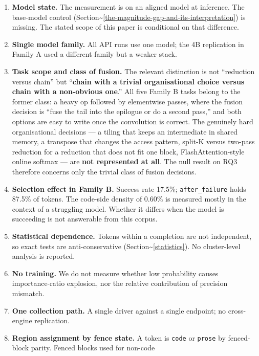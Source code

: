 \documentclass[
  11pt,
]{article}
\providecommand{\tightlist}{%
  \setlength{\itemsep}{0pt}\setlength{\parskip}{0pt}}
\begin{document}
\begin{enumerate}
\def\labelenumi{\arabic{enumi}.}
\tightlist
\item
  \textbf{Model state.} The measurement is on an aligned model at
  inference. The base-model control
  (Section\textasciitilde{}\ref{the-magnitude-gap-and-its-interpretation})
  is missing. The stated scope of this paper is conditional on that
  difference.
\item
  \textbf{Single model family.} All API runs use one model; the 4B
  replication in Family A used a different family but a weaker stack.
\item
  \textbf{Task scope and class of fusion.} The relevant distinction is
  not ``reduction versus chain'' but ``\textbf{chain with a trivial
  organisational choice versus chain with a non-obvious one}.'' All five
  Family B tasks belong to the former class: a heavy op followed by
  elementwise passes, where the fusion decision is ``fuse the tail into
  the epilogue or do a second pass,'' and both options are easy to write
  once the convolution is correct. The genuinely hard organisational
  decisions --- a tiling that keeps an intermediate in shared memory, a
  transpose that changes the access pattern, split-K versus two-pass
  reduction for a reduction that does not fit one block,
  FlashAttention-style online softmax --- are \textbf{not represented at
  all}. The null result on RQ3 therefore concerns only the trivial class
  of fusion decisions.
\item
  \textbf{Selection effect in Family B.} Success rate 17.5\%;
  \texttt{after\_failure} holds 87.5\% of tokens. The code-side density
  of 0.60\% is measured mostly in the context of a struggling model.
  Whether it differs when the model is succeeding is not answerable from
  this corpus.
\item
  \textbf{Statistical dependence.} Tokens within a completion are not
  independent, so exact tests are anti-conservative
  (Section\textasciitilde{}\ref{statistics}). No cluster-level analysis
  is reported.
\item
  \textbf{No training.} We do not measure whether low probability causes
  importance-ratio explosion, nor the relative contribution of precision
  mismatch.
\item
  \textbf{One collection path.} A single driver against a single
  endpoint; no cross-engine replication.
\item
  \textbf{Region assignment by fence state.} A token is \texttt{code} or
  \texttt{prose} by fenced-block parity. Fenced blocks used for non-code

\end{enumerate}
\end{document}
